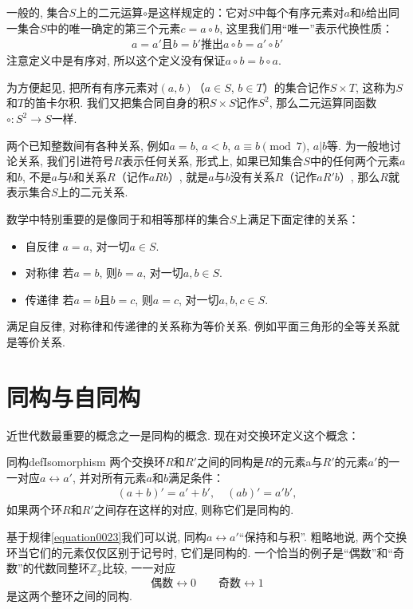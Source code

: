 一般的, 集合$S$上的二元运算$\circ$是这样规定的：它对$S$中每个有序元素对$a$和$b$给出同一集合$S$中的唯一确定的第三个元素$c=a \circ b$, 这里我们用“唯一”表示代换性质：
\begin{gather}\label{equation0022}
a=a'\text{且}b=b'\text{推出}a \circ b = a' \circ b'
\end{gather}
注意定义中是有序对, 所以这个定义没有保证$a \circ b = b \circ a$. 

为方便起见, 把所有有序元素对$(a, b)$（$a \in S$, $b \in T$）的集合记作$S \times T$, 这称为$S$和$T$的笛卡尔积. 我们又把集合同自身的积$S \times S$记作$S^2$, 那么二元运算同函数$\circ: S^2 \to S$一样. 

两个已知整数间有各种关系, 例如$a=b$, $a<b$, $a \equiv b \pmod{7}$, $a|b$等. 为一般地讨论关系, 我们引进符号$R$表示任何关系, 形式上, 如果已知集合$S$中的任何两个元素$a$和$b$, 不是$a$与$b$和关系$R$（记作$aRb$）, 就是$a$与$b$没有关系$R$（记作$aR'b$）, 那么$R$就表示集合$S$上的二元关系. 

数学中特别重要的是像同于和相等那样的集合$S$上满足下面定律的关系：
\begin{itemize}
\item 自反律 $a=a$, 对一切$a \in S$. 
\item 对称律 若$a=b$, 则$b=a$, 对一切$a, b \in S$. 
\item 传递律 若$a=b$且$b=c$, 则$a=c$, 对一切$a, b, c \in S$. 
\end{itemize}
满足自反律, 对称律和传递律的关系称为等价关系. 例如平面三角形的全等关系就是等价关系. 


\section{同构与自同构}\label{section0010112}
近世代数最重要的概念之一是同构的概念. 现在对交换环定义这个概念：
\begin{definition}{同构}{defIsomorphism}
两个交换环$R$和$R'$之间的同构是$R$的元素a与$R'$的元素$a'$的一一对应$a \leftrightarrow a'$, 并对所有元素$a$和$b$满足条件：
\begin{gather}\label{equation0023}
(a+b)'=a'+b',\quad (ab)'=a'b',
\end{gather}
如果两个环$R$和$R'$之间存在这样的对应, 则称它们是同构的. 
\end{definition}
基于规律\ref{equation0023}我们可以说, 同构$a \leftrightarrow a'$“保持和与积”. 粗略地说, 两个交换环当它们的元素仅仅区别于记号时, 它们是同构的. 一个恰当的例子是“偶数”和“奇数”的代数同整环$\mathbb{Z}_2$比较, 一一对应
\[
\text{偶数}\leftrightarrow 0 \quad\quad \text{奇数}\leftrightarrow 1
\]
是这两个整环之间的同构. 

